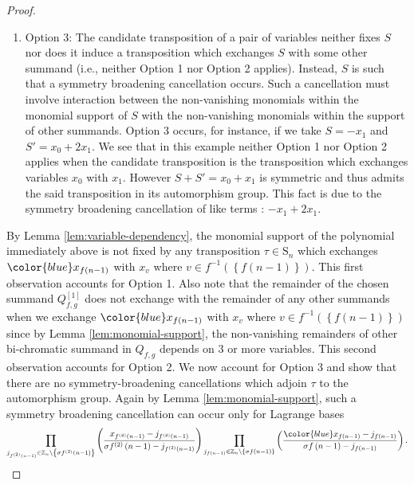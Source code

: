\begin{proof}
\begin{enumerate}
other summand from the partition say, $S'$. This occurs, for instance,
if we consider the sum $S+S'$ where $S=(x_{0})^{2}\,x_{1}$ and $S'=x_{0}\,(x_{1})^{2}$.
In this example, we see that transposition which exchanges variables
$x_{0}$ with $x_{1}$ does not fix $S$, but it induces a transposition
which exchanges the summand $S$ with the summand $S'$.
\item Option 3: The candidate transposition of a pair of variables neither
fixes $S$ nor does it induce a transposition which exchanges $S$
with some other summand (i.e., neither Option 1 nor Option 2 applies).
Instead, $S$ is such that a symmetry broadening cancellation occurs.
Such a cancellation must involve interaction between the non-vanishing
monomials within the monomial support of $S$ with the non-vanishing monomials
within the support of other summands. Option 3 occurs, for instance,
if we take $S=-x_{1}$ and $S'=x_{0}+2x_{1}$. We see that in this
example neither Option 1 nor Option 2 applies when the candidate transposition
is the transposition which exchanges variables $x_{0}$ with $x_{1}$.
However $S+S'=x_{0}+x_{1}$ is symmetric and thus admits the said transposition
in its automorphism group. This fact is due to the symmetry broadening
cancellation of like terms : $-x_{1}+2x_{1}$.
\end{enumerate}
By Lemma \ref{lem:variable-dependency}, the monomial support of the polynomial immediately above is not fixed by any
transposition $\tau\in\text{S}_{n}$ which exchanges ${\color{blue}x_{f\left(n-1\right)}}$
with $x_{v}$ where $v\in f^{-1}\left(\left\{ f\left(n-1\right)\right\} \right)$.
This first observation accounts for Option 1. Also note that the remainder
of the chosen summand $Q_{f,g}^{\left[1\right]}$ does not exchange with the remainder of any
other summands when we exchange ${\color{blue}x_{f\left(n-1\right)}}$
with $x_{v}$ where $v\in f^{-1}\left(\left\{ f\left(n-1\right)\right\} \right)$ since by Lemma \ref{lem:monomial-support}, the non-vanishing remainders of other
bi-chromatic summand in $Q_{f,g}$ depends on $3$ or more variables.
This second observation accounts for Option 2. We now account for
Option 3 and show that there are no symmetry-broadening
cancellations which adjoin $\tau$ to the automorphism group. Again by Lemma \ref{lem:monomial-support}, such a symmetry broadening cancellation
can occur only for Lagrange bases
\[
\prod_{j_{f^{(2)}\left(n-1\right)}\in\mathbb{Z}_{n}\backslash\left\{ \sigma f^{(2)}\left(n-1\right)\right\} }\left(\frac{x_{f^{(2)}\left(n-1\right)}-j_{f^{(2)}\left(n-1\right)}}{\sigma f^{(2)}\left(n-1\right)-j_{f^{(2)}\left(n-1\right)}}\right)\prod_{j_{f\left(n-1\right)}\in\mathbb{Z}_{n}\backslash\left\{ \sigma f\left(n-1\right)\right\} }\left(\frac{{\color{blue}x_{f\left(n-1\right)}}-j_{f\left(n-1\right)}}{\sigma f\left(n-1\right)-j_{f\left(n-1\right)}}\right).
\]
\end{proof}
